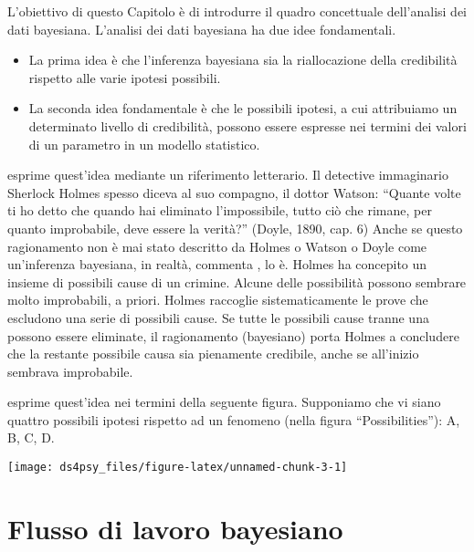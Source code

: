 \documentclass[
]{book}
\providecommand{\tightlist}{%
  \setlength{\itemsep}{0pt}\setlength{\parskip}{0pt}}
\theoremstyle{definition}
\theoremstyle{definition}
\theoremstyle{definition}
\theoremstyle{definition}
\theoremstyle{remark}
\begin{document}
L'obiettivo di questo Capitolo è di introdurre il quadro concettuale dell'analisi dei dati bayesiana. L'analisi dei dati bayesiana ha due idee fondamentali.

\begin{itemize}
\tightlist
\item
  La prima idea è che l'inferenza bayesiana sia la riallocazione della credibilità rispetto alle varie ipotesi possibili.
\item
  La seconda idea fondamentale è che le possibili ipotesi, a cui attribuiamo un determinato livello di credibilità, possono essere espresse nei termini dei valori di un parametro in un modello statistico.
\end{itemize}

\citet{doing_bayesian_data_an} esprime quest'idea mediante un riferimento letterario. Il detective immaginario Sherlock Holmes spesso diceva al suo compagno, il dottor Watson: ``Quante volte ti ho detto che quando hai eliminato l'impossibile, tutto ciò che rimane, per quanto improbabile, deve essere la verità?'' (Doyle, 1890, cap. 6) Anche se questo ragionamento non è mai stato descritto da Holmes o Watson o Doyle come un'inferenza bayesiana, in realtà, commenta \citet{doing_bayesian_data_an}, lo è. Holmes ha concepito un insieme di possibili cause di un crimine. Alcune delle possibilità possono sembrare molto improbabili, a priori. Holmes raccoglie sistematicamente le prove che escludono una serie di possibili cause. Se tutte le possibili cause tranne una possono essere eliminate, il ragionamento (bayesiano) porta Holmes a concludere che la restante possibile causa sia pienamente credibile, anche se all'inizio sembrava improbabile.

\citet{doing_bayesian_data_an} esprime quest'idea nei termini della seguente figura. Supponiamo che vi siano quattro possibili ipotesi rispetto ad un fenomeno (nella figura ``Possibilities''): A, B, C, D.

\begin{center}\texttt{[image: ds4psy\_files/figure-latex/unnamed-chunk-3-1]} \end{center}

\hypertarget{flusso-di-lavoro-bayesiano}{%
\section{Flusso di lavoro bayesiano}\label{flusso-di-lavoro-bayesiano}}
\end{document}

